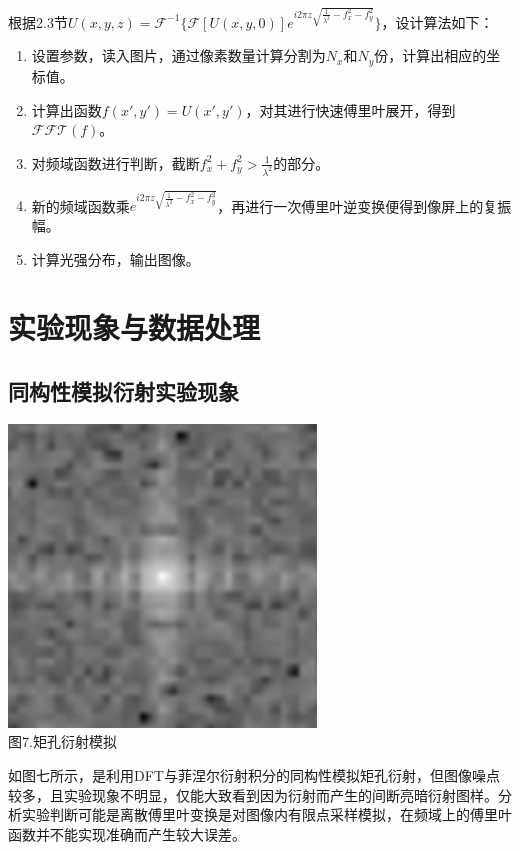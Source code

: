 \documentclass[a4paper,12pt]{article}
\begin{document}
根据2.3节$U(x,y,z)=\mathcal F^{-1}\{\mathcal F[U(x,y,0)]e^{i2\pi z\sqrt{\frac{1}{\lambda^2}-f_x^2-f_y^2}}\}$，设计算法如下：
\begin{enumerate}
	\item 设置参数，读入图片，通过像素数量计算分割为$N_x$和$N_y$份，计算出相应的坐标值。
	\item 计算出函数$f(x',y')=U(x',y')$，对其进行快速傅里叶展开，得到$\mathcal{FFT}(f)$。
	\item 对频域函数进行判断，截断$f_x^2+f_y^2>\frac{1}{\lambda^2}$的部分。
	\item 新的频域函数乘$e^{i2\pi z\sqrt{\frac{1}{\lambda^2}-f_x^2-f_y^2}}$，再进行一次傅里叶逆变换便得到像屏上的复振幅。
	\item 计算光强分布，输出图像。
\end{enumerate}

\newpage	
\section{实验现象与数据处理}
	\subsection{同构性模拟衍射实验现象}
\begin{center}
	\includegraphics[scale=1.05]{Pica6.png}\\
	图7.矩孔衍射模拟
\end{center}\vspace{0.2cm}
如图七所示，是利用DFT与菲涅尔衍射积分的同构性模拟矩孔衍射，但图像噪点较多，且实验现象不明显，仅能大致看到因为衍射而产生的间断亮暗衍射图样。分析实验判断可能是离散傅里叶变换是对图像内有限点采样模拟，在频域上的傅里叶函数并不能实现准确而产生较大误差。
\end{document}
